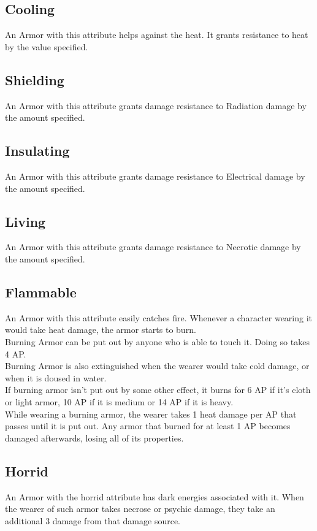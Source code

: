 \subsection{Cooling}\label{armor:cooling}
An Armor with this attribute helps against the heat.
It grants resistance to heat by the value specified.

\subsection{Shielding}\label{armor:shielding}
An Armor with this attribute grants damage resistance to Radiation damage by the amount specified.

\subsection{Insulating}\label{armor:insulating}
An Armor with this attribute grants damage resistance to Electrical damage by the amount specified.

\subsection{Living}\label{armor:living}
An Armor with this attribute grants damage resistance to Necrotic damage by the amount specified.

\subsection{Flammable}\label{armor:flammable}
An Armor with this attribute easily catches fire.
Whenever a character wearing it would take heat damage, the armor starts to burn.\\
Burning Armor can be put out by anyone who is able to touch it.
Doing so takes 4 AP.\\
Burning Armor is also extinguished when the wearer would take cold damage, or when it is doused in water.\\
If burning armor isn't put out by some other effect, it burns for 6 AP if it's cloth or light armor, 10 AP if it is medium or 14 AP if it is heavy.\\
While wearing a burning armor, the wearer takes 1 heat damage per AP that passes until it is put out.
Any armor that burned for at least 1 AP becomes damaged afterwards, losing all of its properties.

\subsection{Horrid}\label{armor:horrid}
An Armor with the horrid attribute has dark energies associated with it.
When the wearer of such armor takes necrose or psychic damage, they take an additional 3 damage from that damage source.

